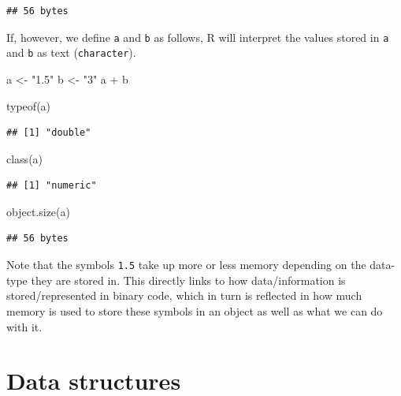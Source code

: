 \documentclass[
  12pt,
]{style/krantz}
\newenvironment{Shaded}{\begin{snugshade}}{\end{snugshade}}
\newcommand{\FunctionTok}[1]{\textcolor[rgb]{0.00,0.00,0.00}{#1}}
\newcommand{\NormalTok}[1]{#1}
\newcommand{\OtherTok}[1]{\textcolor[rgb]{0.56,0.35,0.01}{#1}}
\newcommand{\SpecialCharTok}[1]{\textcolor[rgb]{0.00,0.00,0.00}{#1}}
\newcommand{\StringTok}[1]{\textcolor[rgb]{0.31,0.60,0.02}{#1}}
\begin{document}
\begin{verbatim}
## 56 bytes
\end{verbatim}

If, however, we define \texttt{a} and \texttt{b} as follows, R will interpret the values stored in \texttt{a} and \texttt{b} as text (\texttt{character}).

\begin{Shaded}
\begin{Highlighting}[]
\NormalTok{a }\OtherTok{\textless{}{-}} \StringTok{"1.5"}
\NormalTok{b }\OtherTok{\textless{}{-}} \StringTok{"3"}
\NormalTok{a }\SpecialCharTok{+}\NormalTok{ b}
\end{Highlighting}
\end{Shaded}

\begin{Shaded}
\begin{Highlighting}[]
\FunctionTok{typeof}\NormalTok{(a)}
\end{Highlighting}
\end{Shaded}

\begin{verbatim}
## [1] "double"
\end{verbatim}

\begin{Shaded}
\begin{Highlighting}[]
\FunctionTok{class}\NormalTok{(a)}
\end{Highlighting}
\end{Shaded}

\begin{verbatim}
## [1] "numeric"
\end{verbatim}

\begin{Shaded}
\begin{Highlighting}[]
\FunctionTok{object.size}\NormalTok{(a)}
\end{Highlighting}
\end{Shaded}

\begin{verbatim}
## 56 bytes
\end{verbatim}

Note that the symbols \texttt{1.5} take up more or less memory depending on the data-type they are stored in. This directly links to how data/information is stored/represented in binary code, which in turn is reflected in how much memory is used to store these symbols in an object as well as what we can do with it.

\hypertarget{data-structures}{%
\section{Data structures}\label{data-structures}}
\end{document}
